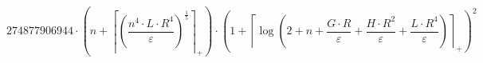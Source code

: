 \[274877906944 \cdot \left(n + \left\lceil \left(\frac{n^{4} \cdot L \cdot R^{4}}{\varepsilon}\right)^{\frac{1}{5}} \right\rceil_{+}\right) \cdot \left(1 + \left\lceil \log\left(2 + n + \frac{G \cdot R}{\varepsilon} + \frac{H \cdot R^{2}}{\varepsilon} + \frac{L \cdot R^{4}}{\varepsilon}\right) \right\rceil_{+}\right)^{2}\]
